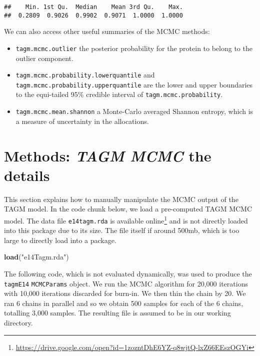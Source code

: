 \documentclass[9pt,a4paper,]{extarticle}
\newenvironment{Shaded}{\begin{snugshade}}{\end{snugshade}}
\newcommand{\KeywordTok}[1]{\textcolor[rgb]{0.13,0.29,0.53}{\textbf{#1}}}
\newcommand{\NormalTok}[1]{#1}
\newcommand{\StringTok}[1]{\textcolor[rgb]{0.31,0.60,0.02}{#1}}
\begin{document}
\begin{verbatim}
##    Min. 1st Qu.  Median    Mean 3rd Qu.    Max. 
##  0.2809  0.9026  0.9902  0.9071  1.0000  1.0000
\end{verbatim}

We can also access other useful summaries of the MCMC methods:

\begin{itemize}
\item
  \texttt{tagm.mcmc.outlier} the posterior probability for the protein
  to belong to the outlier component.
\item
  \texttt{tagm.mcmc.probability.lowerquantile} and \texttt{tagm.mcmc.probability.upperquantile}
  are the lower and upper boundaries to the equi-tailed 95\% credible interval
  of \texttt{tagm.mcmc.probability}.
\item
  \texttt{tagm.mcmc.mean.shannon} a Monte-Carlo averaged Shannon entropy,
  which is a measure of uncertainty in the allocations.
\end{itemize}

\hypertarget{methods-tagm-mcmc-the-details}{%
\section{\texorpdfstring{Methods: \emph{TAGM MCMC} the details}{Methods: TAGM MCMC the details}}\label{methods-tagm-mcmc-the-details}}

This section explains how to manually manipulate the MCMC output of
the TAGM model. In the code chunk below, we load a pre-computed
TAGM MCMC model. The data file \texttt{e14tagm.rda} is available online\footnote{\url{https://drive.google.com/open?id=1zozntDhE6YZ-q8wjtQ-lxZ66EEszOGYi}}
and is not directly loaded into this package due to its size. The file
itself if around 500mb, which is too large to directly load into a package.

\begin{Shaded}
\begin{Highlighting}[]
\KeywordTok{load}\NormalTok{(}\StringTok{"e14Tagm.rda"}\NormalTok{)}
\end{Highlighting}
\end{Shaded}

The following code, which is not evaluated dynamically, was used to
produce the \texttt{tagmE14} \texttt{MCMCParams} object. We run the MCMC algorithm
for 20,000 iterations with 10,000 iterations discarded for burn-in. We
then thin the chain by 20. We ran 6 chains in parallel and so we
obtain 500 samples for each of the 6 chains, totalling 3,000
samples. The resulting file is assumed to be in our working directory.
\end{document}
